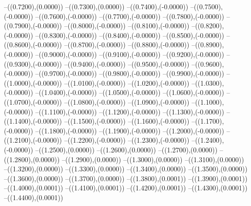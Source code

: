 {	--({\sx*(0.7200)},{\sy*(0.0000)})
	--({\sx*(0.7300)},{\sy*(0.0000)})
	--({\sx*(0.7400)},{\sy*(-0.0000)})
	--({\sx*(0.7500)},{\sy*(-0.0000)})
	--({\sx*(0.7600)},{\sy*(-0.0000)})
	--({\sx*(0.7700)},{\sy*(-0.0000)})
	--({\sx*(0.7800)},{\sy*(-0.0000)})
	--({\sx*(0.7900)},{\sy*(-0.0000)})
	--({\sx*(0.8000)},{\sy*(-0.0000)})
	--({\sx*(0.8100)},{\sy*(-0.0000)})
	--({\sx*(0.8200)},{\sy*(-0.0000)})
	--({\sx*(0.8300)},{\sy*(-0.0000)})
	--({\sx*(0.8400)},{\sy*(-0.0000)})
	--({\sx*(0.8500)},{\sy*(-0.0000)})
	--({\sx*(0.8600)},{\sy*(-0.0000)})
	--({\sx*(0.8700)},{\sy*(-0.0000)})
	--({\sx*(0.8800)},{\sy*(-0.0000)})
	--({\sx*(0.8900)},{\sy*(-0.0000)})
	--({\sx*(0.9000)},{\sy*(-0.0000)})
	--({\sx*(0.9100)},{\sy*(-0.0000)})
	--({\sx*(0.9200)},{\sy*(-0.0000)})
	--({\sx*(0.9300)},{\sy*(-0.0000)})
	--({\sx*(0.9400)},{\sy*(-0.0000)})
	--({\sx*(0.9500)},{\sy*(-0.0000)})
	--({\sx*(0.9600)},{\sy*(-0.0000)})
	--({\sx*(0.9700)},{\sy*(-0.0000)})
	--({\sx*(0.9800)},{\sy*(-0.0000)})
	--({\sx*(0.9900)},{\sy*(-0.0000)})
	--({\sx*(1.0000)},{\sy*(-0.0000)})
	--({\sx*(1.0100)},{\sy*(-0.0000)})
	--({\sx*(1.0200)},{\sy*(-0.0000)})
	--({\sx*(1.0300)},{\sy*(-0.0000)})
	--({\sx*(1.0400)},{\sy*(-0.0000)})
	--({\sx*(1.0500)},{\sy*(-0.0000)})
	--({\sx*(1.0600)},{\sy*(-0.0000)})
	--({\sx*(1.0700)},{\sy*(-0.0000)})
	--({\sx*(1.0800)},{\sy*(-0.0000)})
	--({\sx*(1.0900)},{\sy*(-0.0000)})
	--({\sx*(1.1000)},{\sy*(-0.0000)})
	--({\sx*(1.1100)},{\sy*(-0.0000)})
	--({\sx*(1.1200)},{\sy*(-0.0000)})
	--({\sx*(1.1300)},{\sy*(-0.0000)})
	--({\sx*(1.1400)},{\sy*(-0.0000)})
	--({\sx*(1.1500)},{\sy*(-0.0000)})
	--({\sx*(1.1600)},{\sy*(-0.0000)})
	--({\sx*(1.1700)},{\sy*(-0.0000)})
	--({\sx*(1.1800)},{\sy*(-0.0000)})
	--({\sx*(1.1900)},{\sy*(-0.0000)})
	--({\sx*(1.2000)},{\sy*(-0.0000)})
	--({\sx*(1.2100)},{\sy*(-0.0000)})
	--({\sx*(1.2200)},{\sy*(-0.0000)})
	--({\sx*(1.2300)},{\sy*(-0.0000)})
	--({\sx*(1.2400)},{\sy*(-0.0000)})
	--({\sx*(1.2500)},{\sy*(0.0000)})
	--({\sx*(1.2600)},{\sy*(0.0000)})
	--({\sx*(1.2700)},{\sy*(0.0000)})
	--({\sx*(1.2800)},{\sy*(0.0000)})
	--({\sx*(1.2900)},{\sy*(0.0000)})
	--({\sx*(1.3000)},{\sy*(0.0000)})
	--({\sx*(1.3100)},{\sy*(0.0000)})
	--({\sx*(1.3200)},{\sy*(0.0000)})
	--({\sx*(1.3300)},{\sy*(0.0000)})
	--({\sx*(1.3400)},{\sy*(0.0000)})
	--({\sx*(1.3500)},{\sy*(0.0000)})
	--({\sx*(1.3600)},{\sy*(0.0000)})
	--({\sx*(1.3700)},{\sy*(0.0000)})
	--({\sx*(1.3800)},{\sy*(0.0001)})
	--({\sx*(1.3900)},{\sy*(0.0001)})
	--({\sx*(1.4000)},{\sy*(0.0001)})
	--({\sx*(1.4100)},{\sy*(0.0001)})
	--({\sx*(1.4200)},{\sy*(0.0001)})
	--({\sx*(1.4300)},{\sy*(0.0001)})
	--({\sx*(1.4400)},{\sy*(0.0001)})
}
